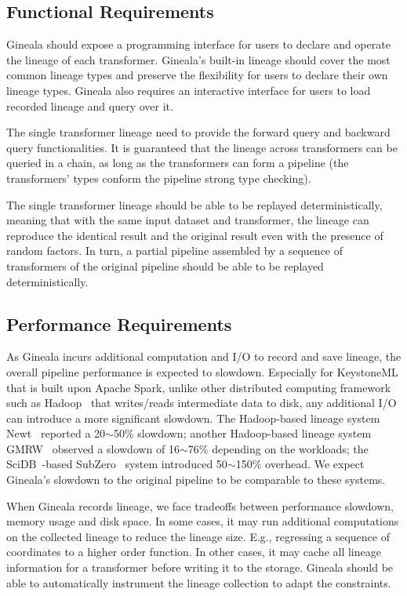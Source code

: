 \documentclass{sig-alternate}
\begin{document}
\subsection{Functional Requirements}
Gineala should expose a programming interface for users to declare and operate the lineage of each transformer. 
Gineala's built-in lineage should cover the most common lineage types and preserve the flexibility for users to declare their own lineage types.
Gineala also requires an interactive interface for users to load recorded lineage and query over it.

The single transformer lineage need to provide the forward query and backward query functionalities. 
It is  guaranteed that the lineage across transformers can be queried in a chain, as long as the transformers
can form a pipeline (the transformers' types conform the pipeline strong type checking).

The single transformer lineage should be able to be replayed deterministically, meaning that with the same input dataset and transformer,
the lineage can reproduce the identical result and the original result even with the presence of random factors.
In turn, a partial pipeline assembled by a sequence of transformers of the original pipeline should be able to be replayed deterministically.

\subsection{Performance Requirements}
\label{sec:Req-Perf}
As Gineala incurs additional computation and I/O to record and save lineage, the overall pipeline performance is expected to slowdown.
Especially for KeystoneML that is built upon Apache Spark, unlike other distributed computing framework such as Hadoop~\cite{HADOOP} 
that writes/reads intermediate data to disk, any additional I/O can introduce a more significant slowdown. 
The Hadoop-based lineage system Newt~\cite{logothetis13} reported a 20$\sim$50\% slowdown; 
another Hadoop-based lineage system GMRW~\cite{ikeda11} observed a slowdown of 16$\sim$76\% depending on the workloads;
the SciDB~\cite{brown10}-based SubZero~\cite{wu13} system introduced 50$\sim$150\% overhead. 
We expect Gineala's slowdown to the original pipeline to be comparable to these systems.

When Gineala records lineage, we face tradeoffs between performance slowdown, memory usage and disk space.
In some cases, it may run additional computations on the collected lineage to reduce the lineage size. 
E.g., regressing a sequence of coordinates to a higher order function. 
In other cases, it may cache all lineage information for a transformer before writing it to the storage. 
Gineala should be able to automatically instrument the lineage collection to adapt the constraints.
\end{document}

